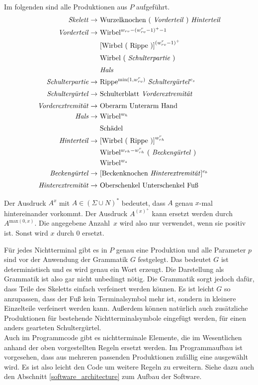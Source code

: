 Im folgenden sind alle Produktionen aus $P$ aufgeführt.
\begin{align*}
 \text{\emph{Skelett}} \rightarrow &\text{ Wurzelknochen ( \emph{Vorderteil} ) \emph{Hinterteil}}\\
 \text{\emph{Vorderteil}} \rightarrow &\text{ Wirbel}^{w_{rv} - (w_{rv}^r - 1)^+ - 1}\\
    &\text{ [Wirbel ( Rippe )]}^{(w_{rv}^r - 1)^+}\\
    &\text{ Wirbel ( \emph{Schulterpartie} )}^{\vphantom{(}}\\
    &\text{ \emph{Hals}}^{\vphantom{(}}\\
 \text{\emph{Schulterpartie}} \rightarrow &\text{ Rippe$^{\text{min}(1,w_{rv}^r)}$ \emph{Schultergürtel}$^{e_s}$}\\ 
 \text{\emph{Schultergürtel}} \rightarrow &\text{ Schulterblatt \emph{Vorderextremität}}^{\vphantom{(}}\\
 \text{\emph{Vorderextremität}} \rightarrow &\text{ Oberarm Unterarm Hand}^{\vphantom{(}}\\
 \text{\emph{Hals}} \rightarrow &\text{ Wirbel$^{w_h}$}\\
    &\text{ Schädel}^{\vphantom{(}}\\
 \text{\emph{Hinterteil}} \rightarrow &\text{ [Wirbel ( Rippe )]}^{w_{rh}^r}\\
    &\text{ Wirbel$^{w_{rh} - w_{rh}^r}$ ( \emph{Beckengürtel} )}\\
    &\text{ Wirbel$^{w_s}$}\\
 \text{\emph{Beckengürtel}} \rightarrow &\text{ [Beckenknochen \emph{Hinterextremität}]$^{e_b}$}\\
 \text{\emph{Hinterextremität}} \rightarrow &\text{ Oberschenkel Unterschenkel Fuß}^{\vphantom{(}}
\end{align*}

Der Ausdruck $A^x$ mit $A \in (\Sigma \cup N)^*$ bedeutet, dass $A$ genau $x$-mal hintereinander vorkommt. Der Ausdruck $A^{(x)^+}$ kann ersetzt werden durch $A^{\text{max}(0, x)}$. Die angegebene \mbox{Anzahl $x$} wird also nur verwendet, wenn sie positiv ist. Sonst wird $x$ durch $0$ ersetzt.

Für jedes Nichtterminal gibt es in $P$ genau eine Produktion und alle Parameter $p$ sind vor der Anwendung der Grammatik $G$ festgelegt. Das bedeutet $G$ ist deterministisch und es wird genau ein Wort erzeugt. Die Darstellung als Grammatik ist also gar nicht unbedingt nötig. Die Grammatik sorgt jedoch dafür, dass Teile des Skeletts einfach verfeinert werden können. Es ist \zb leicht $G$ so anzupassen, dass der Fuß kein Terminalsymbol mehr ist, sondern in kleinere Einzelteile verfeinert werden kann. Außerdem können natürlich auch zusätzliche Produktionen für bestehende Nichtterminalsymbole eingefügt werden, \zb für einen anders gearteten Schultergürtel.\\
Auch im Programmcode gibt es nichtterminale Elemente, die im Wesentlichen anhand der oben vorgestellten Regeln ersetzt werden. Im Programmaufbau ist vorgesehen, dass aus mehreren passenden Produktionen zufällig eine ausgewählt wird. Es ist also leicht den Code um weitere Regeln zu erweitern. Siehe dazu auch den Abschnitt \ref{software_architecture} zum Aufbau der Software.

